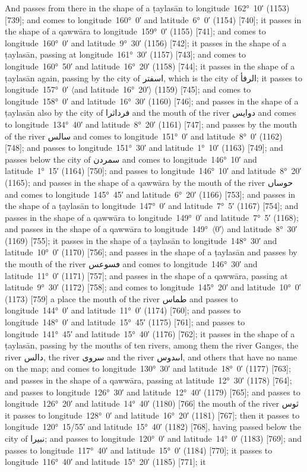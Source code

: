 \documentclass[11pt]{article}
\newcommand{\Pg}[1]{\marginpar{\footnotesize #1}}
\newcommand{\Ang}[1]{\ensuremath{#1}}
\begin{document}
And passes from there in the shape of a ṭaylasān to longitude~162°~10′ (1153) [739]; and comes to longitude~160°~0′ and latitude~6°~0′ (1154) [740]; it passes in the shape of a qawwāra to longitude~159°~0′ (1155) [741]; and comes to longitude~160°~0′ and latitude~9°~30′ (1156) [742]; it passes in the shape of a ṭaylasān, passing at longitude~161°~30′ (1157) [743]; and comes to longitude~160°~50′ and latitude~16°~20′ (1158) [744]; it passes in the shape of a ṭaylasān again, passing by the city of \textarabic{اسفتر}, which is the city of \textarabic{الرفأ}; it passes to longitude~157°~0′ \Ang{\langle}and latitude~16°~20′\Ang{\rangle} (1159) [745]; and comes to longitude~158°~0′ and latitude~16°~30′ (1160) [746]; and passes in the shape of a ṭaylasān also by the city of \textarabic{فرداثرا} and the mouth of the river \textarabic{دوايس} and comes to longitude~134°~40′ and latitude~8°~20′ (1161) [747]; and passes by the mouth of the river \textarabic{سالس} and comes to longitude~151°~0′ and latitude~8°~0′ (1162) [748]; and passes to longitude~151°~30′ and latitude~1°~10′ (1163) [749]; and passes below the city of \textarabic{سمردن} and comes to longitude~146°~10′ and latitude~1°~15′ (1164) [750]; and passes to longitude~146°~10′ and latitude~8°~20′ (1165); and passes in the shape of a qawwāra by the mouth of the river \textarabic{حوساں} and comes to longitude~145°~45′ and latitude~6°~20′ (1166) [753]; and passes in the shape of a ṭaylasān to longitude~147°~0′ and latitude~7°~5′ (1167) [754]\Pg{p. 77}; and passes in the shape of a qawwāra to longitude~149°~0′ and latitude~7°~5′ (1168); and passes in the shape of a qawwāra to longitude~149°~\Ang{\langle}0′\Ang{\rangle} and latitude~8°~30′ (1169) [755]; it passes in the shape of a ṭaylasān to longitude~148°~30′ and latitude~10°~0′ (1170) [756]; and passes in the shape of a ṭaylasān and passes by the mouth of the river \textarabic{ڡسوعس} and comes to longitude~146°~30′ and latitude~11°~0′ (1171) [757]; and passes in the shape of a qawwāra, passing at latitude~9°~30′ (1172) [758]; and comes to longitude~145°~20′ and latitude~10°~0′ (1173) [759] a place the mouth of the river \textarabic{طماس} and passes to longitude~144°~0′ and latitude~11°~0′ (1174) [760]; and passes to longitude~148°~0′ and latitude~15°~45′ (1175) [761]; and passes to longitude~141°~45′ and latitude~15°~40′ (1176) [762]; it passes in the shape of a ṭaylasān, passing by the mouths of ten rivers, among them the river Ganges, the river \textarabic{دالس}, the river \textarabic{سروى} and the river \textarabic{اٮٮدوس}, and others that have no name on the map; and comes to longitude~130°~30′ and latitude~18°~0′ (1177) [763]; and passes in the shape of a qawwāra, passing at latitude~12°~30′ (1178) [764]; and passes to longitude~126°~30′ and latitude~12°~40′ (1179) [765]; and passes to longitude~126°~20′ and latitude~14°~40′ (1180) [766] the mouth of the river \textarabic{ثوس} it passes to longitude~128°~0′ and latitude~16°~20′ (1181) [767]; then it passes to longitude~120°~15/55′ and latitude~15°~40′ (1182) [768], having passed below the city of \textarabic{نبيرا}; and passes to longitude~120°~0′ and latitude~14°~0′ (1183) [769]; and passes to longitude~117°~40′ and latitude~15°~0′ (1184) [770]\Pg{p. 78}; it passes to longitude~116°~40′ and latitude~15°~20′ (1185) [771]; it 
\end{document}
